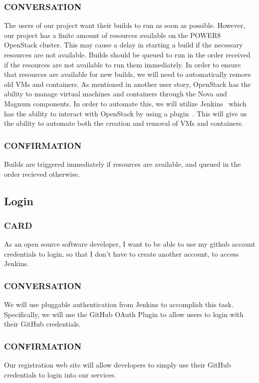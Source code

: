 \documentclass[10pt,letterpaper,onecolumn,journal]{IEEEtran}
\begin{document}
\subsubsection{CONVERSATION}
The users of our project want their builds to run as soon as possible.
However, our project has a finite amount of resources available on the POWER8 OpenStack cluster.
This may cause a delay in starting a build if the necessary resources are not available.
Builds should be queued to run in the order received if the resources are not available to run them immediately.
In order to ensure that resources are available for new builds, we will need to automatically remove old VMs and containers.
As mentioned in another user story, OpenStack has the ability to manage virtual machines and containers through the Nova and Magnum components.
In order to automate this, we will utilize Jenkins~\cite{jenkinsmain} which has the ability to interact with OpenStack by using a plugin~\cite{jcloudsplugin}.
This will give us the ability to automate both the creation and removal of VMs and containers.
\subsubsection{CONFIRMATION}
Builds are triggered immediately if resources are available, and queued in the order recieved otherwise.

\subsection{Login}
\subsubsection{CARD}
As an open source software developer, I want to be able to use my github account credentials to login, so that I don't have to create another account, to access Jenkins.
\subsubsection{CONVERSATION}
We will use pluggable authentication from Jenkins to accomplish this task. Specifically, we will use the GitHub OAuth Plugin to allow users to login with their GitHub credentials. 
\subsubsection{CONFIRMATION}
Our registration web site will allow developers to simply use their GitHub credentials to login into our services.
\end{document}
